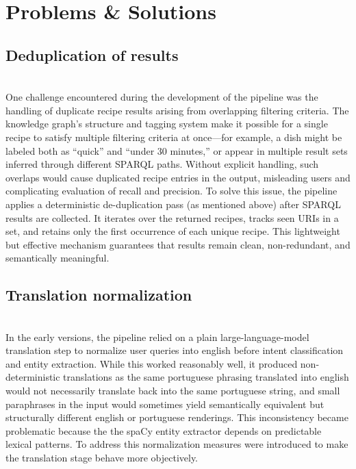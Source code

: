 \documentclass{article}
\begin{document}
\section{Problems \& Solutions}

\subsection{Deduplication of results}
\noindent
\\
One challenge encountered during the development of the pipeline was the handling of duplicate recipe results arising from overlapping filtering criteria.
The knowledge graph’s structure and tagging system make it possible for a single recipe to satisfy multiple filtering criteria at once—for example, a dish might be labeled both as “quick” and “under 30 minutes,” or appear in multiple result sets inferred through different SPARQL paths. Without explicit handling, such overlaps would cause duplicated recipe entries in the output, misleading users and complicating evaluation of recall and precision. To solve this issue, the pipeline applies a deterministic de-duplication pass (as mentioned above) after SPARQL results are collected. It iterates over the returned recipes, tracks seen URIs in a set, and retains only the first occurrence of each unique recipe. This lightweight but effective mechanism guarantees that results remain clean, non-redundant, and semantically meaningful.


\subsection{Translation normalization}
\noindent
\\
In the early versions, the pipeline relied on a plain large-language-model translation step to normalize user queries into english before intent classification and entity extraction. While this worked reasonably well, it produced non-deterministic translations as the same portuguese phrasing translated into english would not necessarily translate back into the same portuguese string, and small paraphrases in the input would sometimes yield semantically equivalent but structurally different english or portuguese renderings. This inconsistency became problematic because the the spaCy entity extractor depends on predictable lexical patterns. To address this normalization measures were introduced to make the translation stage behave more objectively. 
\end{document}
